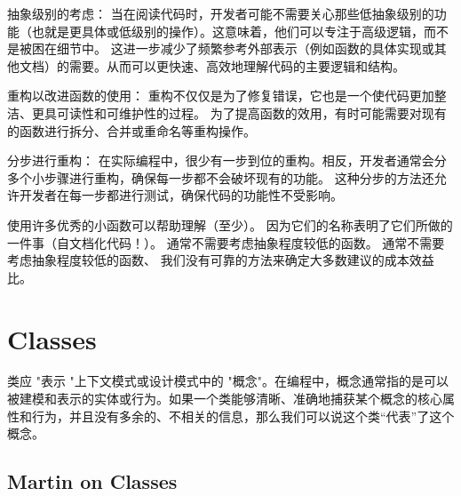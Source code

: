 \documentclass[]{ctexbook}
\begin{document}
抽象级别的考虑：
当在阅读代码时，开发者可能不需要关心那些低抽象级别的功能（也就是更具体或低级别的操作）。这意味着，他们可以专注于高级逻辑，而不是被困在细节中。
这进一步减少了频繁参考外部表示（例如函数的具体实现或其他文档）的需要。从而可以更快速、高效地理解代码的主要逻辑和结构。

重构以改进函数的使用：
重构不仅仅是为了修复错误，它也是一个使代码更加整洁、更具可读性和可维护性的过程。
为了提高函数的效用，有时可能需要对现有的函数进行拆分、合并或重命名等重构操作。

分步进行重构：
在实际编程中，很少有一步到位的重构。相反，开发者通常会分多个小步骤进行重构，确保每一步都不会破坏现有的功能。
这种分步的方法还允许开发者在每一步都进行测试，确保代码的功能性不受影响。

使用许多优秀的小函数可以帮助理解（至少）。
因为它们的名称表明了它们所做的一件事（自文档化代码！）。
通常不需要考虑抽象程度较低的函数。
通常不需要考虑抽象程度较低的函数、
我们没有可靠的方法来确定大多数建议的成本效益比。


\chapter{Classes}

类应 "表示 "上下文模式或设计模式中的 "概念"。在编程中，概念通常指的是可以被建模和表示的实体或行为。如果一个类能够清晰、准确地捕获某个概念的核心属性和行为，并且没有多余的、不相关的信息，那么我们可以说这个类“代表”了这个概念。

\section{Martin on Classes}
\end{document}
